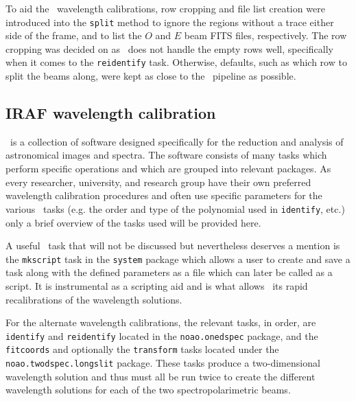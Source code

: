 To aid the \iraf\ wavelength calibrations, row cropping and file list creation were introduced into the \texttt{split} method to ignore the regions without a trace either side of the frame, and to list the $O$ and $E$ beam \gls{FITS} files, respectively. The row cropping was decided on as \iraf\ does not handle the empty rows well, specifically when it comes to the \texttt{reidentify} task. Otherwise, defaults, such as which row to split the beams along, were kept as close to the \polsalt\ pipeline as possible.


\subsection{IRAF wavelength calibration}\label{subsec:IRAF_wav_cal}

\iraf\ is a collection of software designed specifically for the reduction and analysis of astronomical images and spectra. The software consists of many tasks which perform specific operations and which are grouped into relevant packages. As every researcher, university, and research group have their own preferred wavelength calibration procedures and often use specific parameters for the various \iraf\ tasks (e.g. the order and type of the polynomial used in \texttt{identify}, etc.) only a brief overview of the tasks used will be provided here.
\prgph

A useful \iraf\ task that will not be discussed but nevertheless deserves a mention is the \texttt{mkscript} task in the \texttt{system} package which allows a user to create and save a task along with the defined parameters as a file which can later be called as a script. It is instrumental as a scripting aid and is what allows \iraf\ its rapid recalibrations of the wavelength solutions.
\prgph

For the alternate wavelength calibrations, the relevant tasks, in order, are \texttt{identify} and \texttt{reidentify} located in the \texttt{noao.onedspec} package, and the \texttt{fitcoords} and optionally the \texttt{transform} tasks located under the \texttt{noao.twodspec.longslit} package. These tasks produce a two-dimensional wavelength solution and thus must all be run twice to create the different wavelength solutions for each of the two spectropolarimetric beams.

